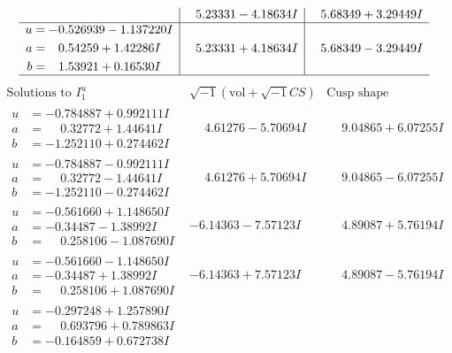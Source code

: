 \documentclass[1p]{elsarticle_modified}
\theoremstyle{definition}
\newcommand{\I}{\sqrt{-1}}
\begin{document}
$$\begin{array}{c|c|c}
 & \phantom{-}5.23331 - 4.18634 I & \phantom{-}5.68349 + 3.29449 I \\ \hline\begin{aligned}
u &= -0.526939 - 1.137220 I \\
a &= \phantom{-}0.54259 + 1.42286 I \\
b &= \phantom{-}1.53921 + 0.16530 I\end{aligned}
 & \phantom{-}5.23331 + 4.18634 I & \phantom{-}5.68349 - 3.29449 I\\
 \hline 
 \end{array}$$\newpage$$\begin{array}{c|c|c}  
\text{Solutions to }I^u_{1}& \I (\text{vol} + \sqrt{-1}CS) & \text{Cusp shape}\\
 \hline 
\begin{aligned}
u &= -0.784887 + 0.992111 I \\
a &= \phantom{-}0.32772 + 1.44641 I \\
b &= -1.252110 + 0.274462 I\end{aligned}
 & \phantom{-}4.61276 - 5.70694 I & \phantom{-}9.04865 + 6.07255 I \\ \hline\begin{aligned}
u &= -0.784887 - 0.992111 I \\
a &= \phantom{-}0.32772 - 1.44641 I \\
b &= -1.252110 - 0.274462 I\end{aligned}
 & \phantom{-}4.61276 + 5.70694 I & \phantom{-}9.04865 - 6.07255 I \\ \hline\begin{aligned}
u &= -0.561660 + 1.148650 I \\
a &= -0.34487 - 1.38992 I \\
b &= \phantom{-}0.258106 - 1.087690 I\end{aligned}
 & -6.14363 - 7.57123 I & \phantom{-}4.89087 + 5.76194 I \\ \hline\begin{aligned}
u &= -0.561660 - 1.148650 I \\
a &= -0.34487 + 1.38992 I \\
b &= \phantom{-}0.258106 + 1.087690 I\end{aligned}
 & -6.14363 + 7.57123 I & \phantom{-}4.89087 - 5.76194 I \\ \hline\begin{aligned}
u &= -0.297248 + 1.257890 I \\
a &= \phantom{-}0.693796 + 0.789863 I \\
b &= -0.164859 + 0.672738 I\end{aligned}

\end{array}$$
\end{document}
